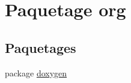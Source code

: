 \hypertarget{namespaceorg}{}\section{Paquetage org}
\label{namespaceorg}
\subsection*{Paquetages}
\begin{DoxyCompactItemize}
\item 
package \hyperlink{namespaceorg_1_1doxygen}{doxygen}
\end{DoxyCompactItemize}
